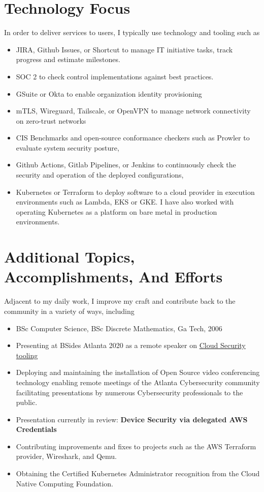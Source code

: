 \documentclass[letterpaper,10pt]{article}
\begin{document}
\section{Technology Focus}
In order to deliver services to users, I typically use technology and tooling such as
\begin{itemize}
	\setlength\itemsep{0.1em}
	\item JIRA, Github Issues, or Shortcut to manage IT initiative tasks, track progress and estimate milestones.
	\item SOC 2 to check control implementations against best practices.
	\item GSuite or Okta to enable organization identity provisioning
	\item mTLS, Wireguard, Tailscale, or OpenVPN to manage network connectivity on zero-trust networks
	\item CIS Benchmarks and open-source conformance checkers such as Prowler to evaluate system security posture,
	\item Github Actions, Gitlab Pipelines, or Jenkins to continuously check the security and operation of the deployed configurations,
	\item Kubernetes or Terraform to deploy software to a cloud provider in execution environments such as Lambda, EKS or GKE. I have also worked with operating Kubernetes as a platform on bare metal in production environments.
\end{itemize}

\section{Additional Topics, Accomplishments, And Efforts}
Adjacent to my daily work, I improve my craft and contribute back to the community in a variety of ways, including
\begin{itemize}
	\setlength\itemsep{0.1em}
	\item BSc Computer Science, BSc Discrete Mathematics, Ga Tech, 2006
	\item Presenting at BSides Atlanta 2020 as a remote speaker on \href{https://www.youtube.com/watch?v=kLCaAaUd1mM}{\color{blue}Cloud Security tooling}
	\item Deploying and maintaining the installation of Open Source video conferencing technology enabling remote meetings of the Atlanta Cybersecurity community facilitating presentations by numerous Cybersecurity professionals to the public.
	\item Presentation currently in review: \textbf{Device Security via delegated AWS Credentials}
	\item Contributing improvements and fixes to projects such as the AWS Terraform provider, Wireshark, and Qemu.
	\item Obtaining the Certified Kubernetes Administrator recognition from the Cloud Native Computing Foundation.
\end{itemize}
\end{document}
